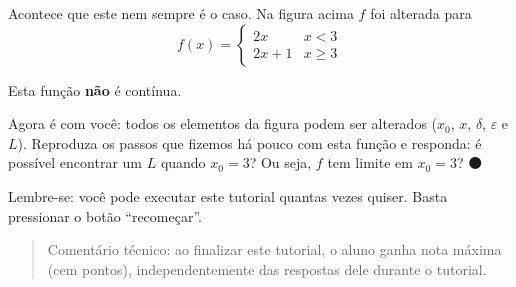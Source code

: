 \documentclass[fleqn,12pt]{scrartcl}
\newenvironment{ct}{\begin{quotation}\color{red!30!black}\sffamily\small Comentário técnico: }{\end{quotation}} %
\newcommand\proceed{\textcolor{green!50!black}{$\medbullet$}\xspace}
\begin{document}
    Acontece que este nem sempre é o caso. Na figura acima $f$ foi alterada para   
    \begin{equation*}
	f(x) = \begin{cases}
	    2x & x < 3 \\
	    2x + 1 & x \ge 3
	\end{cases}
    \end{equation*} 

    Esta função \textbf{não} é contínua.

    Agora é com você: todos os elementos da figura podem ser alterados ($x_0$, $x$, $\delta$, $\varepsilon$ e $L$). Reproduza os passos que fizemos há pouco com esta função e responda: é possível encontrar um $L$ quando $x_0 = 3$? Ou seja, $f$ tem limite em $x_0 = 3$? \proceed

    Lembre-se: você pode executar este tutorial quantas vezes quiser. Basta pressionar o botão ``recomeçar''.

    \begin{ct}
	ao finalizar este tutorial, o aluno ganha nota máxima (cem pontos), independentemente das respostas dele durante o tutorial.
    \end{ct}
\end{document}
